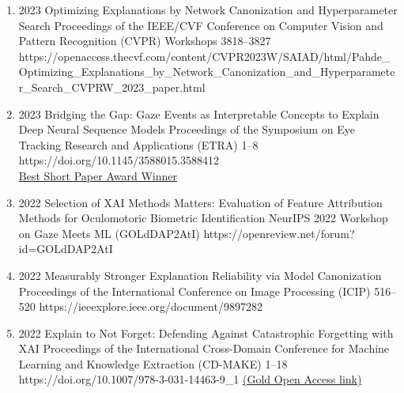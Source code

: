 {\begin{enumerate}
        \item {}
                            {2023}
                            {Optimizing Explanations by Network Canonization and Hyperparameter Search}
                            {Proceedings of the IEEE/CVF Conference on Computer Vision and Pattern Recognition (CVPR) Workshops}
                            {3818--3827}
                            {https://openaccess.thecvf.com/content/CVPR2023W/SAIAD/html/Pahde_Optimizing_Explanations_by_Network_Canonization_and_Hyperparameter_Search_CVPRW_2023_paper.html} 
                            

        \item {}
                            {2023}
                            {Bridging the Gap: Gaze Events as Interpretable Concepts to Explain Deep Neural Sequence Models}
                            {Proceedings of the Symposium on Eye Tracking Research and Applications (ETRA)}
                            {1--8}
                            {https://doi.org/10.1145/3588015.3588412} 
                            {\\\href{https://datacloud.hhi.fraunhofer.de/s/YExo6qyWDxksRof}{Best Short Paper Award Winner}}

        \item {}
                            {2022}
                            {Selection of XAI Methods Matters: Evaluation of Feature Attribution Methods for Oculomotoric Biometric Identification}
                            {NeurIPS 2022 Workshop on Gaze Meets ML}
                            {(GOLdDAP2AtI)}
                            {https://openreview.net/forum?id=GOLdDAP2AtI} 


        \item {}
                            {2022}
                            {Measurably Stronger Explanation Reliability via Model Canonization}
                            {Proceedings of the International Conference on Image Processing (ICIP)}
                            {516--520}
                            {https://ieeexplore.ieee.org/document/9897282}

        \item {}
                            {2022}
                            {Explain to Not Forget: Defending Against Catastrophic Forgetting with XAI}
                            {Proceedings of the International Cross-Domain Conference for Machine Learning and Knowledge Extraction (CD-MAKE)}
                            {1--18}
                            {https://doi.org/10.1007/978-3-031-14463-9_1}
                            {\href{https://link.springer.com/content/pdf/10.1007/978-3-031-04083-2.pdf}{(Gold Open Access link)}} %


\end{enumerate}}
